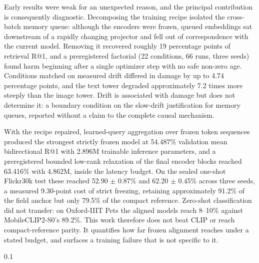 \documentclass[11pt,a4paper,oneside]{report}
\begin{document}
Early results were weak for an unexpected reason, and the principal contribution is consequently diagnostic. Decomposing the training recipe isolated the cross-batch memory queue: although the encoders were frozen, queued embeddings sat downstream of a rapidly changing projector and fell out of correspondence with the current model. Removing it recovered roughly 19 percentage points of retrieval R@1, and a preregistered factorial (22 conditions, 66 runs, three seeds) found harm beginning after a single optimizer step with no safe non-zero age. Conditions matched on measured drift differed in damage by up to 4.74 percentage points, and the text tower degraded approximately 7.2 times more steeply than the image tower. Drift is associated with damage but does not determine it: a boundary condition on the slow-drift justification for memory queues, reported without a claim to the complete causal mechanism.

With the recipe repaired, learned-query aggregation over frozen token sequences produced the strongest strictly frozen model at 54.487\% validation mean bidirectional R@1 with 2.896M trainable inference parameters, and a preregistered bounded low-rank relaxation of the final encoder blocks reached 63.416\% with 4.862M, inside the latency budget. On the sealed one-shot Flickr30k test these reached 52.90 $\pm$ 0.87\% and 62.20 $\pm$ 0.45\% across three seeds, a measured 9.30-point cost of strict freezing, retaining approximately 91.2\% of the field anchor but only 79.5\% of the compact reference. Zero-shot classification did not transfer: on Oxford-IIIT Pets the aligned models reach 8--10\% against MobileCLIP2-S0's 89.2\%. This work therefore does not beat CLIP or reach compact-reference parity. It quantifies how far frozen alignment reaches under a stated budget, and surfaces a training failure that is not specific to it.

\begin{spacing}{0.1}
	\tableofcontents
\end{spacing}


\end{document}
